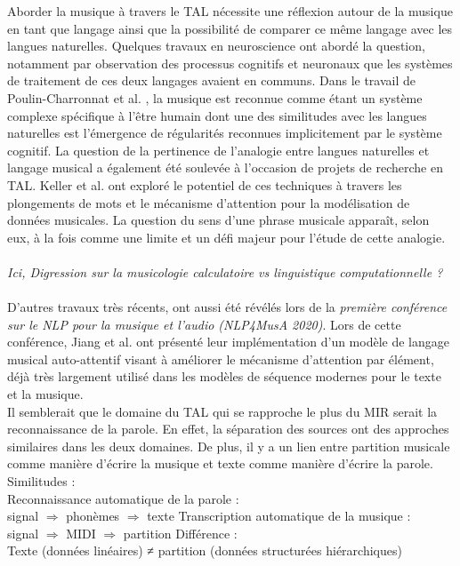 Aborder la musique à travers le TAL nécessite une réflexion autour de la musique en tant que langage ainsi que la possibilité de comparer ce même langage avec les langues naturelles. Quelques travaux en neuroscience ont abordé la question, notamment par observation des processus cognitifs et neuronaux que les systèmes de traitement de ces deux langages avaient en communs. Dans le travail de Poulin-Charronnat et al. \cite{poulincharronnat:hal-01985213}, la musique est reconnue comme étant un système complexe spécifique à l’être humain dont une des similitudes avec les langues naturelles est l’émergence de régularités reconnues implicitement par le système cognitif. La question de la pertinence de l’analogie entre langues naturelles et langage musical a également été soulevée à l’occasion de projets de recherche en TAL. Keller et al. \cite{keller:hal-03279850} ont exploré le potentiel de ces techniques à travers les plongements de mots et le mécanisme d’attention pour la modélisation de données musicales. La question du sens d’une phrase musicale apparaît, selon eux, à la fois comme une limite et un défi majeur pour l’étude de cette analogie.\\\\
\textit{Ici, Digression sur la musicologie calculatoire vs linguistique computationnelle ?}\\\\
D’autres travaux très récents, ont aussi été révélés lors de la \textit{première conférence sur le NLP pour la musique et l'audio (NLP4MusA 2020)}. Lors de cette conférence, Jiang et al. \cite{Jiang2020DiscoveringMR} ont présenté leur implémentation d’un modèle de langage musical auto-attentif visant à améliorer le mécanisme d'attention par élément, déjà très largement utilisé dans les modèles de séquence modernes pour le texte et la musique.\\
Il semblerait que le domaine du TAL qui se rapproche le plus du MIR serait la reconnaissance de la parole. En effet, la séparation des sources ont des approches similaires dans les deux domaines. De plus, il y a un lien entre partition musicale comme manière d’écrire la musique et texte comme manière d’écrire la parole.\\
Similitudes :\\
Reconnaissance automatique de la parole :\\
signal $\Rightarrow$ phonèmes $\Rightarrow$ texte
Transcription automatique de la musique :\\
signal $\Rightarrow$ MIDI $\Rightarrow$ partition
Différence :\\
Texte (données linéaires) ≠ partition (données structurées hiérarchiques)
